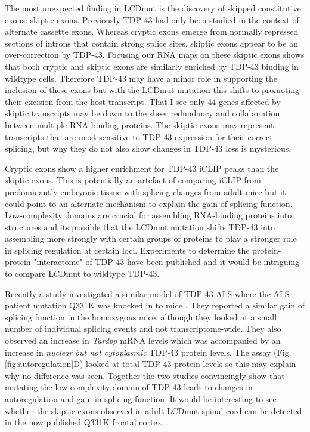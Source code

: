 The most unexpected finding in LCDmut is the discovery of skipped constitutive exons: skiptic exons. 
Previously TDP-43 had only been studied in the context of alternate cassette exons.
Whereas cryptic exons emerge from normally repressed sections of introns that contain strong splice sites, skiptic exons appear to be an over-correction by TDP-43.
Focusing our RNA maps on these skiptic exons shows that both cryptic and skiptic exons are similarly enriched by TDP-43 binding in wildtype cells.
Therefore TDP-43 may have a minor role in supporting the inclusion of these exons but with the LCDmut mutation this shifts to promoting their excision from the host transcript.
That I see only 44 genes affected by skiptic transcripts may be down to the sheer redundancy and collaboration between multiple RNA-binding proteins. 
The skiptic exons may represent transcripts that are most sensitive to TDP-43 expression for their correct splicing, but why they do not also show changes in TDP-43 loss is mysterious.

Cryptic exons show a higher enrichment for TDP-43 iCLIP peaks than the skiptic exons. 
This is potentially an artefact of comparing iCLIP from predominantly embryonic tissue with splicing changes from adult mice but it could point to an alternate mechanism to explain the gain of splicing function.
Low-complexity domains are crucial for assembling RNA-binding proteins into structures  \cite{Gueroussov2017} and its possible that the LCDmut mutation shifts TDP-43 into assembling more strongly with certain groups of proteins to play a stronger role in splicing regulation at certain loci. 
Experiments to determine the protein-protein "interactome" of TDP-43 have been published \citep{Freibaum2010-hw} and it would be intriguing to compare LCDmut to wildtype TDP-43. 

Recently a study investigated a similar model of TDP-43 ALS where the ALS patient mutation Q331K was knocked in to mice \citep{White2018}. 
They reported a similar gain of splicing function in the homozygous mice, although they looked at a small number of individual splicing events and not transcriptome-wide.
They also observed an increase in \textit{Tardbp} mRNA levels which was accompanied by an increase in \textit{nuclear but not cytoplasmic} TDP-43 protein levels.
The assay (Fig. \ref{fig:autoregulation}D) looked at total TDP-43 protein levels so this may explain why no difference was seen. 
Together the two studies convincingly show that mutating the low-complexity domain of TDP-43 leads to changes in autoregulation and gain in splicing function.
It would be interesting to see whether the skiptic exons observed in adult LCDmut spinal cord can be detected in the now published Q331K frontal cortex.
 
